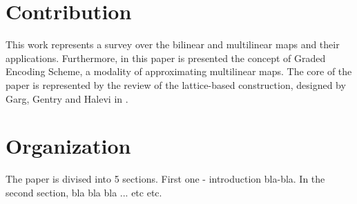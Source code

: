 \section*{Contribution}

This work represents a survey over the bilinear and multilinear maps and their applications. Furthermore, in this paper is presented the concept of Graded Encoding Scheme, a modality of approximating multilinear maps. The core of the paper is represented by the review of the lattice-based construction, designed by Garg, Gentry and Halevi in \cite{GGH13}. 

\section*{Organization}

The paper is divised into 5 sections. First one - introduction bla-bla. In the second section, bla bla bla ... etc etc.